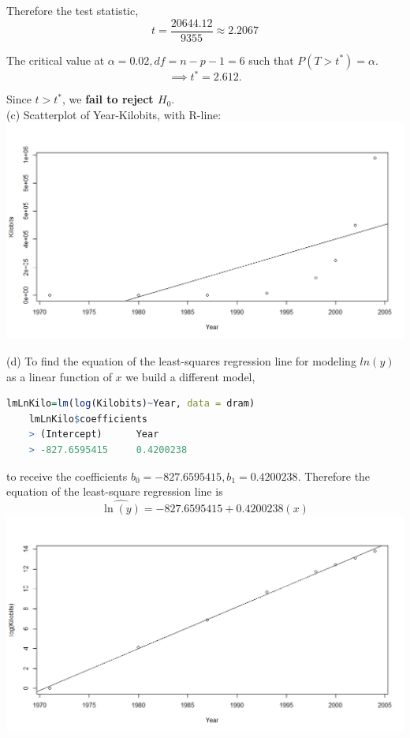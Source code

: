 \documentclass[boxes, qed]{homework}
\begin{document}
\begin{solution}
  Therefore the test statistic, 
  $$t=\frac{20644.12}{9355} \approx \boxed{2.2067}$$

  The critical value at $\alpha=0.02, df=n-p-1=6$ such that $P(T>t^*)=\alpha$.
  $$\implies \boxed{t^*=2.612}.$$

  Since $t>t^*$, we \textbf{fail to reject $H_0$}.\\

  (c) Scatterplot of Year-Kilobits, with R-line:\\
  \includegraphics[scale=.5]{hw-10-2-c}
  
  (d) To find the equation of the least-squares regression line for modeling $ln(y)$ 
  as a linear function of $x$ we build a different model,\\
  \begin{lstlisting}[backgroundcolor = \color{lightgray},language = R]
    lmLnKilo=lm(log(Kilobits)~Year, data = dram)
    lmLnKilo$coefficients
    > (Intercept)      Year 
    > -827.6595415     0.4200238 
  \end{lstlisting}
  to receive the coefficients $b_0=-827.6595415, b_1=0.4200238$.
  Therefore the equation of the least-square regression line is
  $$\hat{\ln(y)}=-827.6595415 + 0.4200238(x)$$
  \includegraphics[scale=.5]{hw-10-2-d}


\end{solution}
\end{document}
